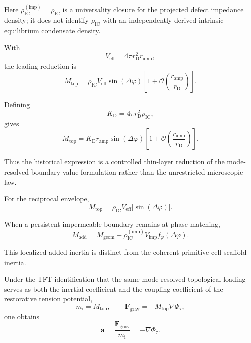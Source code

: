 Here $\rho_{\mathrm{IC}}^{(\mathrm{imp})}=\rho_{\mathrm{IC}}$ is a universality closure for the projected defect impedance density; it does not identify $\rho_{\mathrm{IC}}$ with an independently derived intrinsic equilibrium condensate density.

With
\begin{equation}
    V_{\mathrm{eff}}
    =
    4\pi r_{\mathrm{D}}^2 r_{\mathrm{amp}},
\end{equation}
the leading reduction is
\begin{equation}
    M_{\mathrm{top}}
    =
    \rho_{\mathrm{IC}}
    V_{\mathrm{eff}}
    \sin(\Delta\varphi)
    \left[
        1
        +
        \mathcal{O}
        \left(
            \frac{r_{\mathrm{amp}}}{r_{\mathrm{D}}}
        \right)
    \right].
\end{equation}

Defining
\begin{equation}
    K_{\mathrm{D}}
    =
    4\pi r_{\mathrm{D}}^2
    \rho_{\mathrm{IC}},
\end{equation}
gives
\begin{equation}
    M_{\mathrm{top}}
    =
    K_{\mathrm{D}}
    r_{\mathrm{amp}}
    \sin(\Delta\varphi)
    \left[
        1
        +
        \mathcal{O}
        \left(
            \frac{r_{\mathrm{amp}}}{r_{\mathrm{D}}}
        \right)
    \right].
\end{equation}

Thus the historical expression is a controlled thin-layer reduction of the mode-resolved boundary-value formulation rather than the unrestricted microscopic law.

For the reciprocal envelope,
\begin{equation}
    M_{\mathrm{top}}
    =
    \rho_{\mathrm{IC}}
    V_{\mathrm{eff}}
    |\sin(\Delta\varphi)|.
\end{equation}

When a persistent impermeable boundary remains at phase matching,
\begin{equation}
    M_{\mathrm{add}}
    =
    M_{\mathrm{geom}}
    +
    \rho_{\mathrm{IC}}^{(\mathrm{imp})}
    V_{\mathrm{imp}}
    f_{\varphi}(\Delta\varphi).
\end{equation}

This localized added inertia is distinct from the coherent primitive-cell scaffold inertia.

Under the TFT identification that the same mode-resolved topological loading serves as both the inertial coefficient and the coupling coefficient of the restorative tension potential,
\begin{equation}
    m_{\mathrm{i}}
    =
    M_{\mathrm{top}},
    \qquad
    \mathbf{F}_{\mathrm{grav}}
    =
    -
    M_{\mathrm{top}}
    \nabla\Phi_{\tau},
\end{equation}
one obtains
\begin{equation}
    \mathbf{a}
    =
    \frac{\mathbf{F}_{\mathrm{grav}}}{m_{\mathrm{i}}}
    =
    -\nabla\Phi_{\tau}.
\end{equation}

